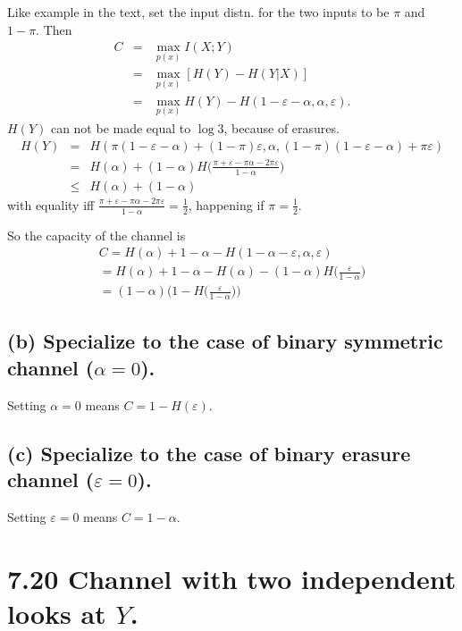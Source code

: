 \documentclass[12pt]{article}
\begin{document}
\begin{tiny}
\begin{multicols}{2}
Like example in the text, set the input distn. for the two inputs to be $\pi$ and $1-\pi$. Then
\begin{eqnarray*}
    C &=& \max_{p(x)}I(X;Y) \\
    &=& \max_{p(x)}[H(Y) - H(Y|X)] \\
    &=& \max_{p(x)}H(Y) - H(1-\varepsilon-\alpha,\alpha,\varepsilon).
\end{eqnarray*}
$H(Y)$ can not be made equal to $\log 3$, because of erasures. 
\begin{eqnarray*}
    H(Y) &=& H( \pi(1-\varepsilon-\alpha) + (1-\pi)\varepsilon,\alpha,(1-\pi)(1-\varepsilon-\alpha) + \pi\varepsilon ) \\
    &=& H(\alpha) + (1-\alpha)H\bigg(\frac{\pi+\varepsilon -\pi\alpha-2\pi\varepsilon}{1-\alpha}\bigg) \\
    &\le& H(\alpha) + (1-\alpha)
\end{eqnarray*}
with equality iff $\frac{\pi+\varepsilon -\pi\alpha-2\pi\varepsilon}{1-\alpha} = \frac{1}{2}$, happening if $\pi = \frac{1}{2}$.

So the capacity of the channel is
\begin{eqnarray*}
    C = H(\alpha) + 1 - \alpha - H(1-\alpha-\varepsilon,\alpha,\varepsilon) \\
    = H(\alpha) + 1 - \alpha - H(\alpha) - (1-\alpha) H\bigg(\frac{\varepsilon}{1-\alpha}\bigg) \\
    = (1-\alpha) \bigg(1 - H\bigg(\frac{\varepsilon}{1-\alpha}\bigg)\bigg)
\end{eqnarray*}

\subsection*{(b) Specialize to the case of binary symmetric channel ($\alpha = 0$).}

Setting $\alpha = 0$ means $C=1-H(\varepsilon)$.

\subsection*{(c) Specialize to the case of binary erasure channel ($\varepsilon = 0$).}
Setting $\varepsilon = 0$ means $C=1-\alpha$.

\section*{7.20 Channel with two independent looks at $Y$.}


\end{multicols}
\end{tiny}
\end{document}
